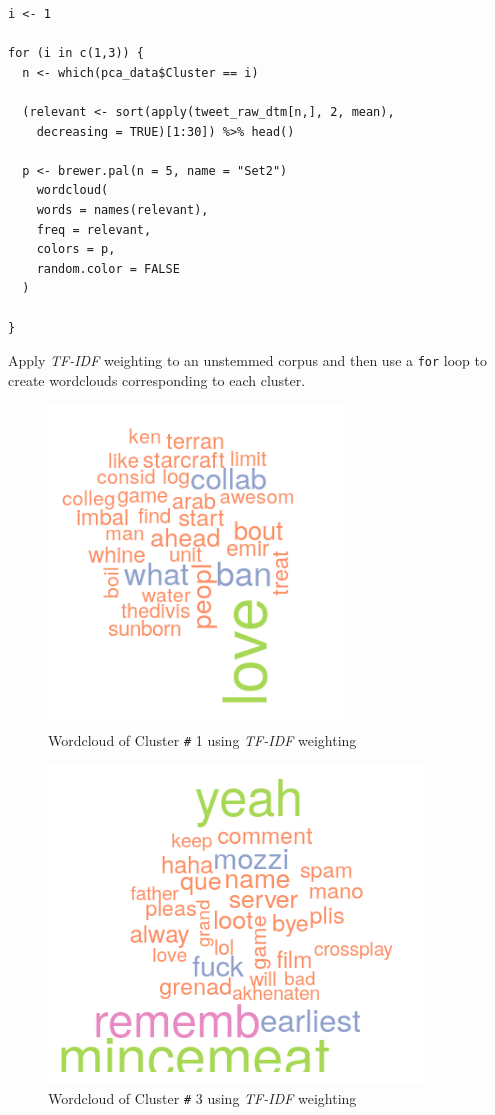 \documentclass[11pt]{article}
\begin{document}
\begin{listing}[htbp]
\begin{verbatim}
i <- 1

for (i in c(1,3)) {
  n <- which(pca_data$Cluster == i)

  (relevant <- sort(apply(tweet_raw_dtm[n,], 2, mean),
    decreasing = TRUE)[1:30]) %>% head()

  p <- brewer.pal(n = 5, name = "Set2")
    wordcloud(
    words = names(relevant),
    freq = relevant,
    colors = p,
    random.color = FALSE
  )

}
\end{verbatim}
\caption{\label{orgddec120}Apply \emph{TF-IDF} weighting to an unstemmed corpus and then use a \texttt{for} loop to create wordclouds corresponding to each cluster.}
\end{listing}

\begin{figure}[htbp]
\centering
\includegraphics[width=8cm]{./Figures/Cluster1Cloud.png}
\caption{\label{fig:org2367118}Wordcloud of Cluster \texttt{\#} 1 using \emph{TF-IDF} weighting}
\end{figure}

\begin{figure}[htbp]
\centering
\includegraphics[width=10cm]{./Figures/Cluster3Cloud.png}
\caption{\label{fig:orge434ee3}Wordcloud of Cluster \texttt{\#} 3 using \emph{TF-IDF} weighting}
\end{figure}
\end{document}
